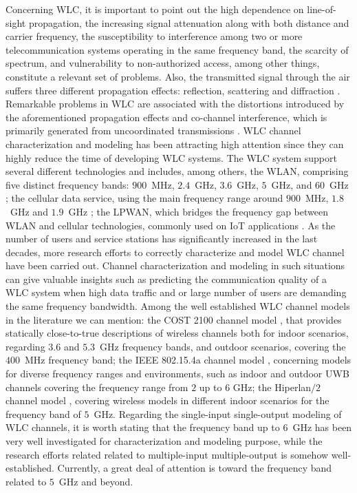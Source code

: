 \documentclass[journal]{IEEEtran}
\begin{document}
Concerning \ac{WLC}, it is important to point out the high dependence on line-of-sight propagation, the increasing signal attenuation along with both distance and carrier frequency, the susceptibility to interference among two or more telecommunication systems operating in the same frequency band, the scarcity of spectrum, and vulnerability to non-authorized access, among other things, constitute a relevant set of problems. Also, the transmitted signal through the air suffers three different propagation effects: reflection, scattering and diffraction \cite{Guze}. Remarkable problems in \ac{WLC} are associated with the distortions introduced by the aforementioned propagation effects and co-channel interference, which is primarily generated from uncoordinated transmissions \cite{Sayed2015}.  
%
\ac{WLC} channel characterization and modeling has been attracting high attention since they can highly reduce the time of developing \ac{WLC} systems. The \ac{WLC} system support several different technologies and includes, among others, the \ac{WLAN}, comprising five distinct frequency bands: $900$~MHz, $2.4$~GHz, $3.6$~GHz, $5$~GHz, and $60$~GHz \cite{IEEEWI}; the cellular data service, using the main frequency range around $900$~MHz, $1.8$~GHz and $1.9$~GHz \cite{GSM}; the \ac{LPWAN}, which bridges the frequency gap between \ac{WLAN} and cellular technologies, commonly used on \ac{IoT} applications \cite{Patel}. As the number of users and service stations has significantly increased in the last decades, more research efforts to correctly characterize and model \ac{WLC} channel have been carried out. Channel characterization and modeling in such situations can give valuable insights such as predicting the communication quality of a \ac{WLC} system when high data traffic and or large number of users are demanding the same frequency bandwidth. Among the well established \ac{WLC} channel models in the literature we can mention: the COST 2100 channel model \cite{COST}, that provides statically close-to-true descriptions of wireless channels both for indoor scenarios, regarding $3.6$ and $5.3$~GHz frequency bands, and outdoor scenarios, covering the $400$~MHz frequency band; the IEEE 802.15.4a channel model \cite{802.15}, concerning models for diverse frequency ranges and environments, such as indoor and outdoor \ac{UWB} channels covering the frequency range from $2$ up to $6$ GHz; the Hiperlan$/2$ channel model \cite{Hiperlan2}, covering wireless models in different indoor scenarios for the frequency band of $5$~GHz. Regarding the single-input single-output modeling of \ac{WLC} channels, it is worth stating that the frequency band up to $6$~GHz has been very well investigated for characterization and modeling purpose, while the research efforts related related to multiple-input multiple-output is somehow well-established. Currently, a great deal of attention is toward the frequency band related to $5$~GHz and beyond.
\end{document}
